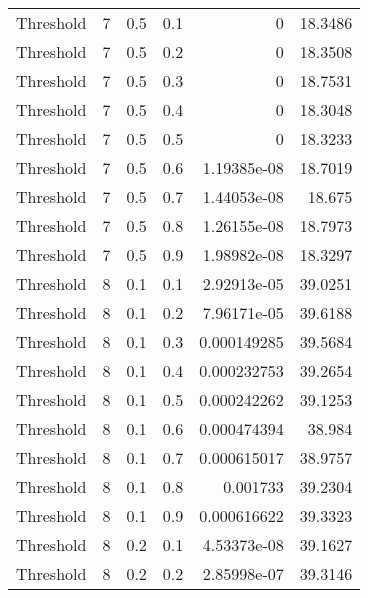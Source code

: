 \documentclass{article}
\begin{document}
\begin{longtable}[H]{lrrrrr}
 Threshold      &       7 &   0.5 &            0.1 &      0           &         18.3486 \\
 Threshold      &       7 &   0.5 &            0.2 &      0           &         18.3508 \\
 Threshold      &       7 &   0.5 &            0.3 &      0           &         18.7531 \\
 Threshold      &       7 &   0.5 &            0.4 &      0           &         18.3048 \\
 Threshold      &       7 &   0.5 &            0.5 &      0           &         18.3233 \\
 Threshold      &       7 &   0.5 &            0.6 &      1.19385e-08 &         18.7019 \\
 Threshold      &       7 &   0.5 &            0.7 &      1.44053e-08 &         18.675  \\
 Threshold      &       7 &   0.5 &            0.8 &      1.26155e-08 &         18.7973 \\
 Threshold      &       7 &   0.5 &            0.9 &      1.98982e-08 &         18.3297 \\
 Threshold      &       8 &   0.1 &            0.1 &      2.92913e-05 &         39.0251 \\
 Threshold      &       8 &   0.1 &            0.2 &      7.96171e-05 &         39.6188 \\
 Threshold      &       8 &   0.1 &            0.3 &      0.000149285 &         39.5684 \\
 Threshold      &       8 &   0.1 &            0.4 &      0.000232753 &         39.2654 \\
 Threshold      &       8 &   0.1 &            0.5 &      0.000242262 &         39.1253 \\
 Threshold      &       8 &   0.1 &            0.6 &      0.000474394 &         38.984  \\
 Threshold      &       8 &   0.1 &            0.7 &      0.000615017 &         38.9757 \\
 Threshold      &       8 &   0.1 &            0.8 &      0.001733    &         39.2304 \\
 Threshold      &       8 &   0.1 &            0.9 &      0.000616622 &         39.3323 \\
 Threshold      &       8 &   0.2 &            0.1 &      4.53373e-08 &         39.1627 \\
 Threshold      &       8 &   0.2 &            0.2 &      2.85998e-07 &         39.3146 \\

\end{longtable}
\end{document}
